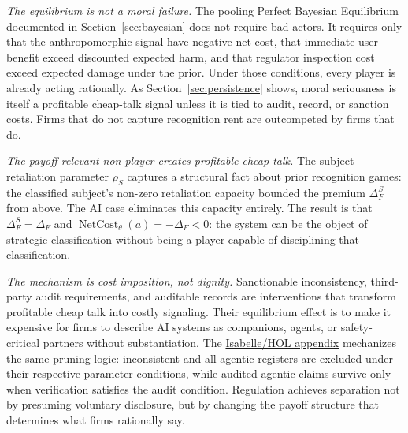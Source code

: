 \documentclass[preprint,authoryear]{elsarticle}
\theoremstyle{definition}
\theoremstyle{plain}
\begin{document}
\emph{The equilibrium is not a moral failure.} The pooling Perfect Bayesian Equilibrium documented in Section~\ref{sec:bayesian} does not require bad actors. It requires only that the anthropomorphic signal have negative net cost, that immediate user benefit exceed discounted expected harm, and that regulator inspection cost exceed expected damage under the prior. Under those conditions, every player is already acting rationally. As Section~\ref{sec:persistence} shows, moral seriousness is itself a profitable cheap-talk signal unless it is tied to audit, record, or sanction costs. Firms that do not capture recognition rent are outcompeted by firms that do.

\emph{The payoff-relevant non-player creates profitable cheap talk.} The subject-retaliation parameter $\rho_S$ captures a structural fact about prior recognition games: the classified subject's non-zero retaliation capacity bounded the premium $\Delta_F^S$ from above. The AI case eliminates this capacity entirely. The result is that $\Delta_F^S=\Delta_F$ and $\operatorname{NetCost}_{\theta}(a)=-\Delta_F<0$: the system can be the object of strategic classification without being a player capable of disciplining that classification.

\begin{sloppypar}
\emph{The mechanism is cost imposition, not dignity.} Sanctionable inconsistency, third-party audit requirements, and auditable records are interventions that transform profitable cheap talk into costly signaling. Their equilibrium effect is to make it expensive for firms to describe AI systems as companions, agents, or safety-critical partners without substantiation. The \hyperref[app:isabelle]{Isabelle/HOL appendix} mechanizes the same pruning logic: inconsistent and all-agentic registers are excluded under their respective parameter conditions, while audited agentic claims survive only when verification satisfies the audit condition. Regulation achieves separation not by presuming voluntary disclosure, but by changing the payoff structure that determines what firms rationally say.
\end{sloppypar}
\end{document}
